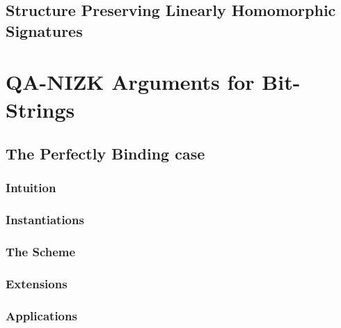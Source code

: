     \section{Structure Preserving Linearly Homomorphic Signatures}

        

\chapter {QA-NIZK Arguments for Bit-Strings} \label{sec:bits}

    

    \section{The Perfectly Binding case} \label{sec:bits-binding} 
    
        

        \subsection{Intuition} \label{sec:bits-intuition}

             

        \subsection{Instantiations} \label{sec:bits-instantiations}

            

        \subsection{The Scheme} \label{sec:bits-scheme}

            

        \subsection{Extensions} \label{sec:bits-extensions}

            

        \subsection{Applications} \label{sec:bits-applications}


